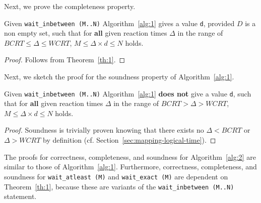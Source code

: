 Next, we prove the completeness property.
\begin{theorem}
  Given \texttt{wait\_inbetween (M..N)} Algorithm\-~\ref{alg:1} gives a
  value \texttt{d}, provided $D$ is a non empty set, such that for
  \textbf{all} given reaction times $\Delta$ in the range of $BCRT \leq
  \Delta \leq WCRT$, $M \leq \Delta \times d \leq N$ holds.
\end{theorem}
\begin{proof}
  Follows from Theorem~\ref{th:1}.
\end{proof}

Next, we sketch the proof for the soundness property of
Algorithm~\ref{alg:1}.

\begin{theorem}
  Given \texttt{wait\_inbetween (M..N)} Algorithm\-~\ref{alg:1}
  \textbf{does not} give a value \texttt{d}, such that for \textbf{all}
  given reaction times $\Delta$ in the range of $BCRT > \Delta > WCRT$,
  $M \leq \Delta \times d \leq N$ holds.
\end{theorem}

\begin{proof}
  Soundness is trivially proven knowing that there exists no $\Delta <
  BCRT$ or $\Delta > WCRT$ by definition
  (cf. Section~\ref{sec:mapping-logical-time}).
\end{proof}

The proofs for correctness, completeness, and soundness for
Algorithm~\ref{alg:2} are similar to those of
Algorithm~\ref{alg:1}. Furthermore, correctness, completeness, and
soundness for \texttt{wait\_atleast (M)} and \texttt{wait\_exact (M)}
are dependent on Theorem~\ref{th:1}, because these are variants of the
\texttt{wait\_inbetween (M..N)} statement.

